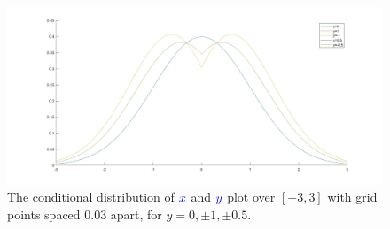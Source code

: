 \documentclass{article}
\renewcommand{\r}[1]{\textcolor{blue}{#1}}
\begin{document}
\begin{figure}[h]
\centering
\includegraphics[width=13cm]{q8fpartd.jpeg}
\caption{The conditional distribution of $\r{x}$ and $\r{y}$ plot over $[-3,3]$ with grid points spaced 0.03 apart, for $y=0,\pm1,\pm0.5$.}
\label{fig:8fd}
\end{figure} 
\end{document}
